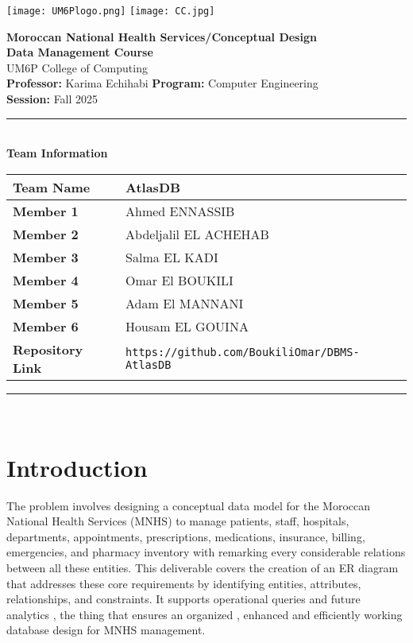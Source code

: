 \documentclass[a4paper,12pt]{article}
\begin{document}
\thispagestyle{empty}
\begin{center}
  \texttt{[image: UM6Plogo.png]}\hfill
  \texttt{[image: CC.jpg]}
  \vspace{1.2cm}

  {\LARGE \textbf{ Moroccan National Health Services/Conceptual Design}}\\[0.6cm]
  {\large \textbf{Data Management Course}}\\[0.2cm]
  {\large UM6P College of Computing}\\[0.8cm]

  {\normalsize \textbf{Professor:} Karima Echihabi \quad 
   \textbf{Program:} Computer Engineering}\\[0.1cm]
  {\normalsize \textbf{Session:} Fall 2025}\\[1cm]

  \rule{0.9\textwidth}{0.5pt}\\[0.5cm]
  {\large \textbf{Team Information}} \\[0.3cm]
  \begin{tabular}{|l|l|}
    \hline
    \textbf{Team Name} & \textbf{AtlasDB}\\ \hline
    \textbf{Member 1}  & Ahmed ENNASSIB\\ \hline
    \textbf{Member 2}  & Abdeljalil EL ACHEHAB\\ \hline
    \textbf{Member 3}  & Salma EL KADI \\ \hline
    \textbf{Member 4}  & Omar El BOUKILI  \\ \hline
    \textbf{Member 5}  & Adam El MANNANI\\ \hline
    \textbf{Member 6}  & Housam EL GOUINA\\ \hline
    \textbf{Repository Link} & \texttt{https://github.com/BoukiliOmar/DBMS-AtlasDB} \\ \hline
    \hline
  \end{tabular}
  \rule{0.9\textwidth}{0.5pt}\\
\end{center}
\clearpage
\pagestyle{fancy}

\section{Introduction}
The problem involves designing a conceptual data model for the Moroccan National Health Services (MNHS) to manage patients, staff, hospitals, departments, appointments, prescriptions, medications, insurance, billing, emergencies, and  pharmacy inventory with remarking every considerable relations between all these entities. This deliverable covers the creation of an ER diagram that addresses these core requirements by identifying entities, attributes, relationships, and constraints. It supports operational queries and future analytics , the thing that ensures an organized , enhanced and efficiently working database design for MNHS management.
\end{document}
